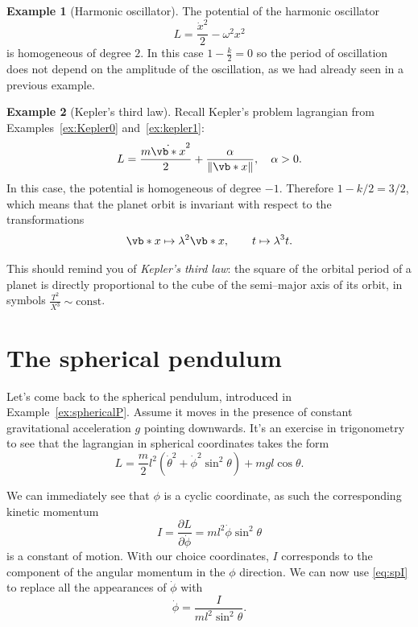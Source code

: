 \documentclass[english,fontsize=11pt,paper=b5]{scrbook}
\numberwithin{equation}{chapter}
\theoremstyle{definition}
\newtheorem{example}{Example}[chapter]
\begin{document}
    \begin{example}[Harmonic oscillator]
      The potential of the harmonic oscillator
      \begin{equation}
        L = \frac{\dot x^2}2 - \omega^2 x^2
      \end{equation}
      is homogeneous of degree $2$. In this case $1-\frac k2 = 0$ so the period of oscillation does not depend on the amplitude of the oscillation, as we had already seen in a previous example.
    \end{example}

    \begin{example}[Kepler's third law]
      Recall Kepler's problem lagrangian from Examples~\ref{ex:Kepler0} and~\ref{ex:kepler1}:
      \begin{equation}
        L = \frac{m \dot{\vb*{x}}^2}{2} + \frac{\alpha}{\|\vb*{x}\|}, \quad \alpha >0.
      \end{equation}
      In this case, the potential is homogeneous of degree $-1$. Therefore $1-k/2 = 3/2$, which means that the planet orbit is invariant with respect to the transformations
      \begin{equation}
        \vb*{x} \mapsto \lambda^2 \vb*{x}, \qquad t \mapsto \lambda^3 t.
      \end{equation}

      This should remind you of \emph{Kepler's third law}: the square of the orbital period of a planet is directly proportional to the cube of the semi--major axis of its orbit, in symbols $\frac{T^2}{X^3} \sim \mathrm{const}$.
    \end{example}

    \section{The spherical pendulum}\label{sec:sphpen}
    Let's come back to the spherical pendulum, introduced in Example~\ref{ex:sphericalP}.
    Assume it moves in the presence of constant gravitational acceleration $g$ pointing downwards.
    It's an exercise in trigonometry to see that the lagrangian in spherical coordinates takes the form
    \begin{equation}
      L = \frac m2 l^2 \left(\dot \theta^2 + \dot \phi^2 \sin^2\theta\right) + mgl \cos \theta.
    \end{equation}

    We can immediately see that $\phi$ is a cyclic coordinate, as such the corresponding kinetic momentum
    \begin{equation}\label{eq:spI}
      I = \frac{\partial L}{\partial \dot\phi} = m l^2 \dot\phi\sin^2 \theta
    \end{equation}
    is a constant of motion.
    With our choice coordinates, $I$ corresponds to the component of the angular momentum in the $\phi$ direction. We can now use \eqref{eq:spI} to replace all the appearances of $\dot\phi$ with
    \begin{equation}
      \dot\phi = \frac{I}{ml^2 \sin^2\theta}.
    \end{equation}
\end{document}
